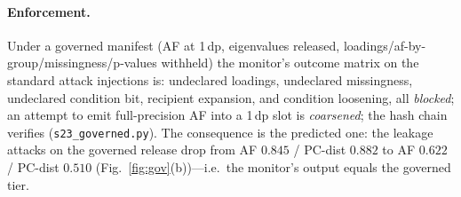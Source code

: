 \documentclass[11pt]{article}
\begin{document}
\paragraph{Enforcement.} Under a governed manifest (AF at 1\,dp, eigenvalues
released, loadings/af-by-group/missingness/p-values withheld) the monitor's
outcome matrix on the standard attack injections is: undeclared loadings,
undeclared missingness, undeclared condition bit, recipient expansion, and
condition loosening, all \emph{blocked}; an attempt to emit full-precision AF
into a 1\,dp slot is \emph{coarsened}; the hash chain verifies
(\texttt{s23\_governed.py}). The consequence is the predicted one: the leakage
attacks on the governed release drop from AF $0.845$ / PC-dist $0.882$ to AF
$0.622$ / PC-dist $0.510$ (Fig.~\ref{fig:gov}(b))---i.e.\ the monitor's output
equals the governed tier.
\end{document}

